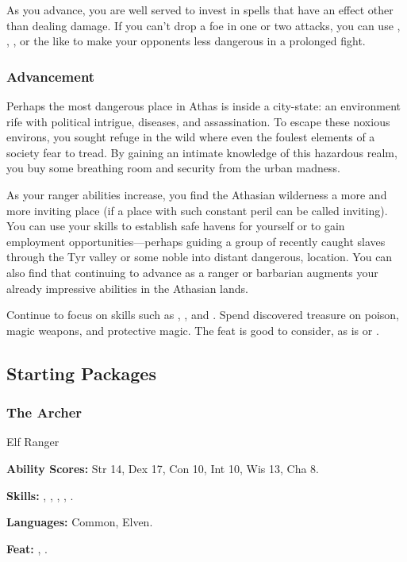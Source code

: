 As you advance, you are well served to invest in spells that have an effect other than dealing damage. If you can't drop a foe in one or two attacks, you can use , , , or the like to make your opponents less dangerous in a prolonged fight.

\subsubsection{Advancement}
Perhaps the most dangerous place in Athas is inside a city-state: an environment rife with political intrigue, diseases, and assassination. To escape these noxious environs, you sought refuge in the wild where even the foulest elements of a society fear to tread. By gaining an intimate knowledge of this hazardous realm, you buy some breathing room and security from the urban madness.

As your ranger abilities increase, you find the Athasian wilderness a more and more inviting place (if a place with such constant peril can be called inviting). You can use your skills to establish safe havens for yourself or to gain employment opportunities---perhaps guiding a group of recently caught slaves through the Tyr valley or some noble into distant dangerous, location. You can also find that continuing to advance as a ranger or barbarian augments your already impressive abilities in the Athasian lands.

Continue to focus on skills such as , , and . Spend discovered treasure on poison, magic weapons, and protective magic. The  feat is good to consider, as is  or .

\subsection{Starting Packages}
\subsubsection{The Archer}
Elf Ranger

\textbf{Ability Scores:} Str 14, Dex 17, Con 10, Int 10, Wis 13, Cha 8.

\textbf{Skills:} , , , , .

\textbf{Languages:} Common, Elven.

\textbf{Feat:} , .

